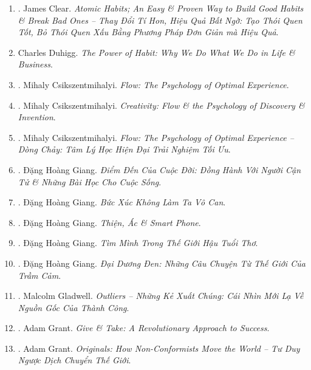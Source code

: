 \documentclass{article}
\begin{document}
\begin{enumerate}
	\item \cite{Clear2022}. James Clear. \textit{Atomic Habits; An Easy \& Proven Way to Build Good Habits \& Break Bad Ones -- Thay Đổi Tí Hon, Hiệu Quả Bất Ngờ: Tạo Thói Quen Tốt, Bỏ Thói Quen Xấu Bằng Phương Pháp Đơn Giản mà Hiệu Quả}.\\\mbox{}\hfill{}
	\item Charles Duhigg. \textit{The Power of Habit: Why We Do What We Do in Life \& Business}.
	\item \cite{Csikszentmihalyi2008}. Mihaly Csikszentmihalyi. \textit{Flow: The Psychology of Optimal Experience}.\hfill{\sf[downloaded]}
	\item \cite{Csikszentmihalyi2013}. Mihaly Csikszentmihalyi. \textit{Creativity: Flow \& the Psychology of Discovery \& Invention}.\hfill{\sf[downloaded]} 
	\item \cite{Csikszentmihalyi2021}. Mihaly Csikszentmihalyi. \textit{Flow: The Psychology of Optimal Experience -- Dòng Chảy: Tâm Lý Học Hiện Đại Trải Nghiệm Tối Ưu}.\hfill{}
	\item \cite{Giang2022a}. Đặng Hoàng Giang. \textit{Điểm Đến Của Cuộc Đời: Đồng Hành Với Người Cận Tử \& Những Bài Học Cho Cuộc Sống}.\\\mbox{}\hfill{}
	\item \cite{Giang2022b}. Đặng Hoàng Giang. \textit{Bức Xúc Không Làm Ta Vô Can}.\hfill{}
	\item \cite{Giang2022c}. Đặng Hoàng Giang. \textit{Thiện, Ác \& Smart Phone}.\hfill{}
	\item \cite{Giang2022d}. Đặng Hoàng Giang. \textit{Tìm Mình Trong Thế Giới Hậu Tuổi Thơ}.\hfill{}
	\item \cite{Giang2023}. Đặng Hoàng Giang. \textit{Đại Dương Đen: Những Câu Chuyện Từ Thế Giới Của Trầm Cảm}.\\\mbox{}\hfill{}
	\item \cite{Gladwell2022}. Malcolm Gladwell. \textit{Outliers -- Những Kẻ Xuất Chúng: Cái Nhìn Mới Lạ Về Nguồn Gốc Của Thành Công}.\\\mbox{}\hfill{}
	\item \cite{Grant2013}. Adam Grant. \textit{Give \& Take: A Revolutionary Approach to Success}.\hfill{\sf[downloaded]}
	\item \cite{Grant2020}. Adam Grant. \textit{Originals: How Non-Conformists Move the World -- Tư Duy Ngược Dịch Chuyển Thế Giới}.\\\mbox{}\hfill{}

\end{enumerate}
\end{document}
